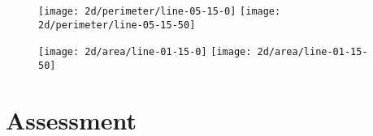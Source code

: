 \begin{figure}[H]
    \centering

    \texttt{[image: 2d/perimeter/line-05-15-0]}
    \texttt{[image: 2d/perimeter/line-05-15-50]}
    \label{fig:line_fixed_perimeter}

    \texttt{[image: 2d/area/line-01-15-0]}
    \texttt{[image: 2d/area/line-01-15-50]}
    \label{fig:line_fixed_area}
\end{figure}


\section{Assessment}




